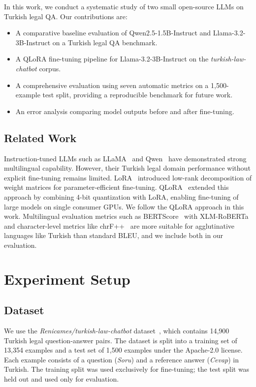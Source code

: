 \documentclass[conference]{IEEEtran}
\begin{document}
In this work, we conduct a systematic study of two small open-source LLMs on Turkish legal
QA. Our contributions are:
\begin{itemize}
  \item A comparative baseline evaluation of Qwen2.5-1.5B-Instruct and
    Llama-3.2-3B-Instruct on a Turkish legal QA benchmark.
  \item A QLoRA fine-tuning pipeline for Llama-3.2-3B-Instruct on the
    \textit{turkish-law-chatbot} corpus.
  \item A comprehensive evaluation using seven automatic metrics on a 1,500-example test
    split, providing a reproducible benchmark for future work.
  \item An error analysis comparing model outputs before and after fine-tuning.
\end{itemize}

\subsection{Related Work}

Instruction-tuned LLMs such as LLaMA~\cite{touvron2023llama} and Qwen~\cite{bai2023qwen}
have demonstrated strong multilingual capability. However, their Turkish legal domain
performance without explicit fine-tuning remains limited.
LoRA~\cite{hu2022lora} introduced low-rank decomposition of weight matrices for
parameter-efficient fine-tuning. QLoRA~\cite{dettmers2023qlora} extended this approach by
combining 4-bit quantization with LoRA, enabling fine-tuning of large models on single
consumer GPUs. We follow the QLoRA approach in this work.
Multilingual evaluation metrics such as BERTScore~\cite{zhang2020bertscore} with
XLM-RoBERTa~\cite{conneau2020xlmroberta} and character-level metrics like
chrF++~\cite{popovic2017chrf} are more suitable for agglutinative languages like Turkish
than standard BLEU, and we include both in our evaluation.

\section{Experiment Setup}

\subsection{Dataset}

We use the \textit{Renicames/turkish-law-chatbot} dataset~\cite{turkishlawchatbot}, which
contains 14,900 Turkish legal question-answer pairs. The dataset is split into a training
set of 13,354 examples and a test set of 1,500 examples under the Apache-2.0 license.
Each example consists of a question (\textit{Soru}) and a reference answer (\textit{Cevap})
in Turkish. The training split was used exclusively for fine-tuning; the test split was
held out and used only for evaluation.
\end{document}
